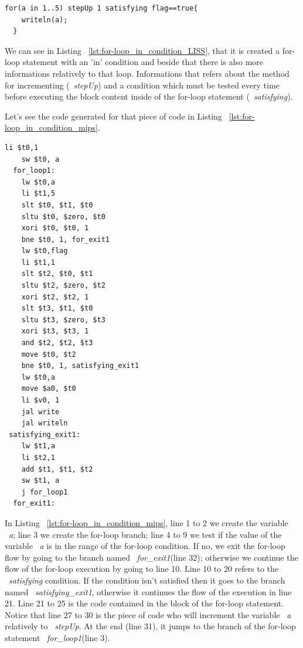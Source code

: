 \documentclass[
  oneside,
  11pt, a4paper,
  footinclude=true,
  headinclude=true,
  cleardoublepage=empty
]{scrbook}
\begin{document}
\begin{lstlisting}[caption={Example of a for-loop statement with 'in' condition in LISS},label={lst:for-loop_in_condition_LISS}]
  for(a in 1..5) stepUp 1 satisfying flag==true{
    writeln(a);
  }
\end{lstlisting}

We can see in Listing ~\ref{lst:for-loop_in_condition_LISS}, that it is created a for-loop statement with an 'in' condition and beside that there is also more informations relatively to that loop. Informations that refers about the method for incrementing (~\textit{stepUp}) and a condition which must be tested every time before executing the block content inside of the for-loop statement (~\textit{satisfying}).

Let's see the code generated for that piece of code in Listing ~\ref{lst:for-loop_in_condition_mips}.

\begin{lstlisting}[caption={Code generated for the LISS code in Listing ~\ref{lst:for-loop_in_condition_LISS}},label={lst:for-loop_in_condition_mips}]
    li $t0,1		
    sw $t0, a		
  for_loop1:
    lw $t0,a		
    li $t1,5		
    slt $t0, $t1, $t0	
    sltu $t0, $zero, $t0	
    xori $t0, $t0, 1	
    bne $t0, 1, for_exit1		
    lw $t0,flag		
    li $t1,1		
    slt $t2, $t0, $t1	
    sltu $t2, $zero, $t2	
    xori $t2, $t2, 1	
    slt $t3, $t1, $t0	
    sltu $t3, $zero, $t3	
    xori $t3, $t3, 1	
    and $t2, $t2, $t3	
    move $t0, $t2		
    bne $t0, 1, satisfying_exit1		
    lw $t0,a		
    move $a0, $t0		
    li $v0, 1
    jal write		
    jal writeln		
 satisfying_exit1:
    lw $t1,a		
    li $t2,1		
    add $t1, $t1, $t2	
    sw $t1, a		
    j for_loop1		
  for_exit1:
\end{lstlisting}

In Listing ~\ref{lst:for-loop_in_condition_mips}, line 1 to 2 we create the variable ~\textit{a}; line 3 we create the for-loop branch; line 4 to 9 we test if the value of the variable ~\textit{a} is in the range of the for-loop condition. If no, we exit the for-loop flow by going to the branch named ~\textit{for\_exit1}(line 32); otherwise we continue the flow of the for-loop execution by going to line 10. Line 10 to 20 refers to the ~\textit{satisfying} condition. If the condition isn't satisfied then it goes to the branch named ~\textit{satisfying\_exit1}, otherwise it continues the flow of the execution in line 21. Line 21 to 25 is the code contained in the block of the for-loop statement. Notice that line 27 to 30 is the piece of code who will increment the variable ~\textit{a} relatively to ~\textit{stepUp}. At the end (line 31), it jumps to the branch of the for-loop statement ~\textit{for\_loop1}(line 3).
\end{document}
